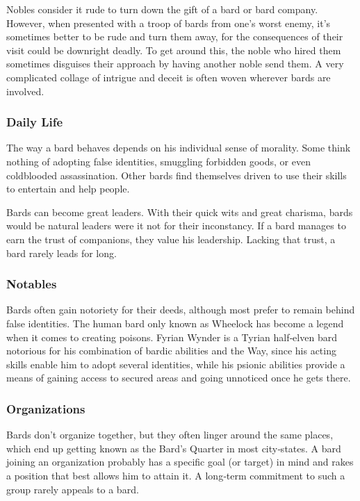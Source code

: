 Nobles consider it rude to turn down the gift of a bard or bard company. However, when presented with a troop of bards from one's worst enemy, it's sometimes better to be rude and turn them away, for the consequences of their visit could be downright deadly. To get around this, the noble who hired them sometimes disguises their approach by having another noble send them. A very complicated collage of intrigue and deceit is often woven wherever bards are involved.

\subsubsection{Daily Life}

The way a bard behaves depends on his individual sense of morality. Some think nothing of adopting false identities, smuggling forbidden goods, or even coldblooded assassination. Other bards find themselves driven to use their skills to entertain and help people.

Bards can become great leaders. With their quick wits and great charisma, bards would be natural leaders were it not for their inconstancy. If a bard manages to earn the trust of companions, they value his leadership. Lacking that trust, a bard rarely leads for long.

\subsubsection{Notables}

Bards often gain notoriety for their deeds, although most prefer to remain behind false identities. The human bard only known as Wheelock has become a legend when it comes to creating poisons. Fyrian Wynder is a Tyrian half‐elven bard notorious for his combination of bardic abilities and the Way, since his acting skills enable him to adopt several identities, while his psionic abilities provide a means of gaining access to secured areas and going unnoticed once he gets there.

\subsubsection{Organizations}

Bards don't organize together, but they often linger around the same places, which end up getting known as the Bard's Quarter in most city‐states. A bard joining an organization probably has a specific goal (or target) in mind and rakes a position that best allows him to attain it. A long‐term commitment to such a group rarely appeals to a bard.

